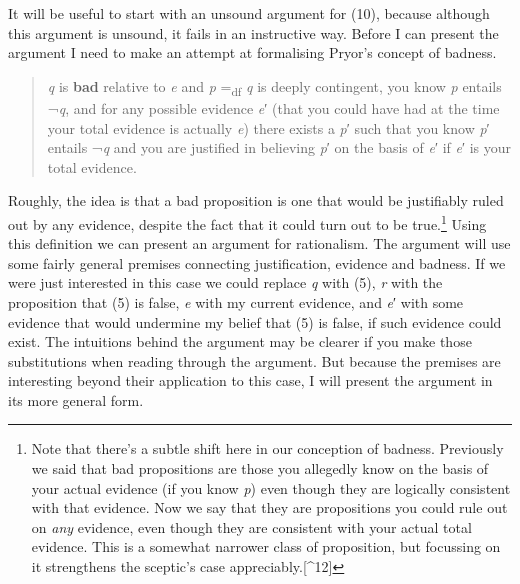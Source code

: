 \documentclass[
  11pt,
  letterpaper,
  DIV=11,
  numbers=noendperiod,
  twoside]{scrartcl}
\begin{document}
It will be useful to start with an unsound argument for (10), because
although this argument is unsound, it fails in an instructive way.
Before I can present the argument I need to make an attempt at
formalising Pryor's concept of badness.

\begin{quote}
\emph{q} is \textbf{bad} relative to \emph{e} and \emph{p}
=\textsubscript{df} \emph{q} is deeply contingent, you know \emph{p}
entails ¬\emph{q}, and for any possible evidence \emph{e}′ (that you
could have had at the time your total evidence is actually \emph{e})
there exists a \emph{p}′ such that you know \emph{p}′ entails ¬\emph{q}
and you are justified in believing \emph{p}′ on the basis of \emph{e}′
if \emph{e}′ is your total evidence.
\end{quote}

Roughly, the idea is that a bad proposition is one that would be
justifiably ruled out by any evidence, despite the fact that it could
turn out to be true.\footnote{Note that there's a subtle shift here in
  our conception of badness. Previously we said that bad propositions
  are those you allegedly know on the basis of your actual evidence (if
  you know \emph{p}) even though they are logically consistent with that
  evidence. Now we say that they are propositions you could rule out on
  \emph{any} evidence, even though they are consistent with your actual
  total evidence. This is a somewhat narrower class of proposition, but
  focussing on it strengthens the sceptic's case
  appreciably.{[}\^{}12{]}} Using this definition we can present an
argument for rationalism. The argument will use some fairly general
premises connecting justification, evidence and badness. If we were just
interested in this case we could replace \emph{q} with (5), \emph{r}
with the proposition that (5) is false, \emph{e} with my current
evidence, and \emph{e}′ with some evidence that would undermine my
belief that (5) is false, if such evidence could exist. The intuitions
behind the argument may be clearer if you make those substitutions when
reading through the argument. But because the premises are interesting
beyond their application to this case, I will present the argument in
its more general form.
\end{document}
